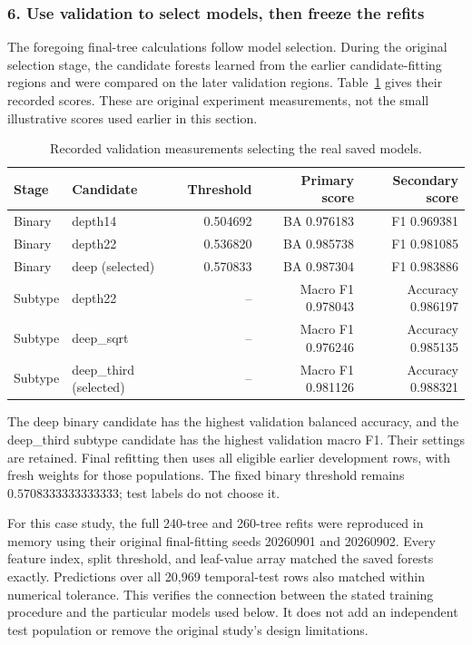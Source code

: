 \subsubsection*{6. Use validation to select models, then freeze the refits}

The foregoing final-tree calculations follow model selection. During the
original selection stage, the candidate forests learned from the earlier
candidate-fitting regions and were compared on the later validation regions.
Table~\ref{tab:real-candidate-selection} gives their recorded scores. These
are original experiment measurements, not the small illustrative scores
used earlier in this section.

\begin{table}[H]
\centering
\small
\caption{Recorded validation measurements selecting the real saved models.}
\label{tab:real-candidate-selection}
\begin{tabular}{@{}llrrr@{}}
\toprule
Stage & Candidate & Threshold & Primary score & Secondary score\\
\midrule
Binary & depth14 & 0.504692 & BA 0.976183 & F1 0.969381\\
Binary & depth22 & 0.536820 & BA 0.985738 & F1 0.981085\\
Binary & deep (selected) & 0.570833 & BA 0.987304 & F1 0.983886\\
\addlinespace
Subtype & depth22 & -- & Macro F1 0.978043 & Accuracy 0.986197\\
Subtype & deep\_sqrt & -- & Macro F1 0.976246 & Accuracy 0.985135\\
Subtype & deep\_third (selected) & -- & Macro F1 0.981126 & Accuracy 0.988321\\
\bottomrule
\end{tabular}
\end{table}

The deep binary candidate has the highest validation balanced accuracy, and
the deep\_third subtype candidate has the highest validation macro F1.
Their settings are retained. Final refitting then uses all eligible earlier
development rows, with fresh weights for those populations. The fixed
binary threshold remains $0.5708333333333333$; test labels do not choose it.

For this case study, the full 240-tree and 260-tree refits were reproduced
in memory using their original final-fitting seeds 20260901 and 20260902.
Every feature index, split threshold, and leaf-value array matched the saved
forests exactly. Predictions over all 20,969 temporal-test rows also matched
within numerical tolerance. This verifies the connection between the stated
training procedure and the particular models used below. It does not add an
independent test population or remove the original study's design limitations.

